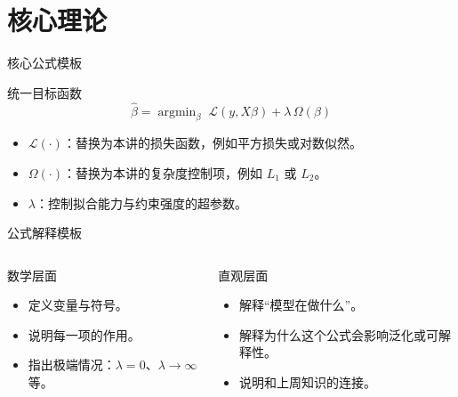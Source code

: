 \documentclass[aspectratio=169,professionalfonts]{beamer}
\newcommand{\argmin}{\mathop{\mathrm{argmin}}}
\newcommand{\lossfn}{\mathcal{L}}
\newcommand{\regterm}{\Omega}
\begin{document}
\section{核心理论}

\begin{frame}{核心公式模板}
    \begin{block}{统一目标函数}
        \[
            \hat{\beta} = \argmin_{\beta} \; \lossfn(y, X\beta) + \lambda \, \regterm(\beta)
        \]
    \end{block}

    \begin{itemize}
        \item $\lossfn(\cdot)$：替换为本讲的损失函数，例如平方损失或对数似然。
        \item $\regterm(\cdot)$：替换为本讲的复杂度控制项，例如 $L_1$ 或 $L_2$。
        \item $\lambda$：控制拟合能力与约束强度的超参数。
    \end{itemize}
\end{frame}

\begin{frame}{公式解释模板}
    \begin{columns}[T,onlytextwidth]
        \begin{block}{数学层面}
            \begin{itemize}
                \item 定义变量与符号。
                \item 说明每一项的作用。
                \item 指出极端情况：$\lambda = 0$、$\lambda \to \infty$ 等。
            \end{itemize}
        \end{block}

        \begin{block}{直观层面}
            \begin{itemize}
                \item 解释“模型在做什么”。
                \item 解释为什么这个公式会影响泛化或可解释性。
                \item 说明和上周知识的连接。
            \end{itemize}
        \end{block}
    \end{columns}
\end{frame}
\end{document}
